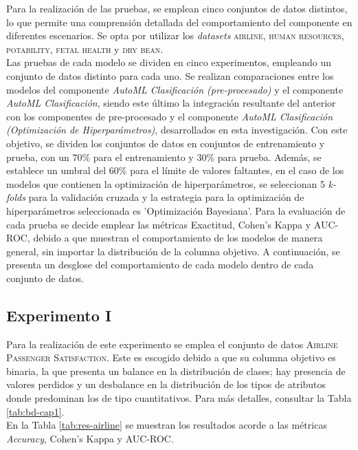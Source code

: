  Para la realización de las pruebas, se emplean cinco conjuntos de datos distintos, lo que permite una comprensión detallada del comportamiento del componente en diferentes escenarios. Se opta por utilizar los \textit{datasets} \textsc{airline}, \textsc{human resources}, \textsc{potability}, \textsc{fetal health} y  \textsc{dry bean}. \\
Las pruebas de cada modelo se dividen en cinco experimentos, empleando un conjunto de datos distinto para cada uno. Se realizan comparaciones entre los modelos del componente \textit{AutoML Clasificación (pre-procesado)} y el componente \textit{AutoML Clasificación}, siendo este último la integración resultante del anterior con los componentes de pre-procesado y el componente \textit{AutoML Clasificación (Optimización de Hiperparámetros)}, desarrollados en esta investigación. Con este objetivo, se dividen los conjuntos de datos en conjuntos de entrenamiento y prueba, con un 70\% para el entrenamiento y 30\% para prueba. Además, se establece un umbral del 60\% para el límite de valores faltantes, en el caso de los modelos que contienen la optimización de hiperparámetros, se seleccionan 5 \textit{k-folds} para la validación cruzada y la estrategia para la optimización de hiperparámetros seleccionada es 'Optimización Bayesiana'. Para la evaluación de cada prueba se decide emplear las métricas Exactitud, Cohen's Kappa y AUC-ROC, debido a que muestran el comportamiento de los modelos de manera general, sin importar la distribución de la columna objetivo. A continuación, se presenta un desglose del comportamiento de cada modelo dentro de cada conjunto de datos.

\subsection{Experimento \textsc{I} }
Para la realización de este experimento se emplea el conjunto de datos \textsc{Airline Passenger Satisfaction}. Este es escogido debido a que su columna objetivo es binaria, la que presenta un balance en la distribución de clases; hay presencia de valores perdidos y un desbalance en la distribución de los tipos de atributos donde predominan los de tipo cuantitativos. Para más detalles, consultar la Tabla \ref{tab:bd-cap1}. \\
En la Tabla \ref{tab:res-airline} se muestran los resultados acorde a las métricas \textit{Accuracy}, Cohen's Kappa y AUC-ROC.



